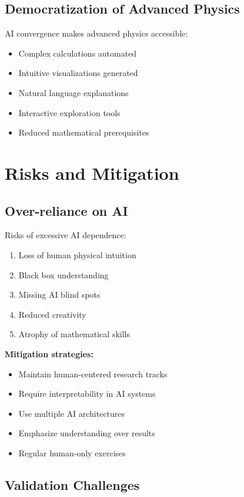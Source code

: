 \documentclass[11pt,a4paper]{article}
\begin{document}
\subsection{Democratization of Advanced Physics}

AI convergence makes advanced physics accessible:

\begin{itemize}
    \item Complex calculations automated
    \item Intuitive visualizations generated
    \item Natural language explanations
    \item Interactive exploration tools
    \item Reduced mathematical prerequisites
\end{itemize}

\section{Risks and Mitigation}

\subsection{Over-reliance on AI}

Risks of excessive AI dependence:

\begin{enumerate}
    \item Loss of human physical intuition
    \item Black box understanding
    \item Missing AI blind spots
    \item Reduced creativity
    \item Atrophy of mathematical skills
\end{enumerate}

\textbf{Mitigation strategies:}
\begin{itemize}
    \item Maintain human-centered research tracks
    \item Require interpretability in AI systems
    \item Use multiple AI architectures
    \item Emphasize understanding over results
    \item Regular human-only exercises
\end{itemize}

\subsection{Validation Challenges}
\end{document}
